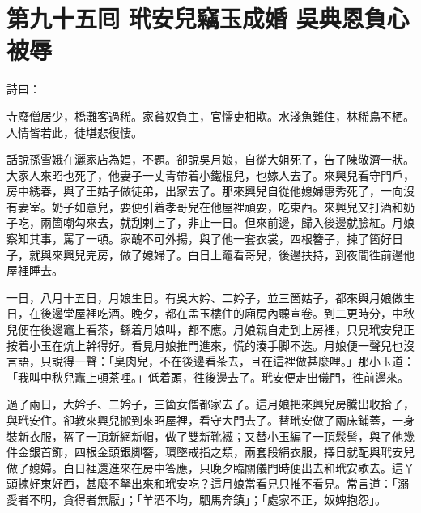 
\chapter*{第九十五囘 玳安兒竊玉成婚 吳典恩負心被辱}


詩曰：

寺廢僧居少，橋灘客過稀。家貧奴負主，官懦吏相欺。水淺魚難住，林稀鳥不栖。人情皆若此，徒堪悲復悽。

話說孫雪娥在灑家店為娼，不題。卻說吳月娘，自從大姐死了，告了陳敬濟一狀。大家人來昭也死了，他妻子一丈青帶着小鐵棍兒，也嫁人去了。來興兒看守門戶，房中綉春，與了王姑子做徒弟，出家去了。{}那來興兒自從他媳婦惠秀死了，一向沒有妻室。奶子如意兒，要便引着孝哥兒在他屋裡頑耍，吃東西。來興兒又打酒和奶子吃，兩箇嘲勾來去，就刮剌上了，非止一日。但來前邊，歸入後邊就臉紅。月娘察知其事，罵了一頓。家醜不可外揚，與了他一套衣裳，四根簪子，揀了箇好日子，就與來興兒完房，做了媳婦了。白日上竈看哥兒，後邊扶持，到夜間徃前邊他屋裡睡去。

一日，八月十五日，月娘生日。有吳大妗、二妗子，並三箇姑子，都來與月娘做生日，在後邊堂屋裡吃酒。晚夕，都在孟玉樓住的廂房內聽宣卷。到二更時分，中秋兒便在後邊竈上看茶，繇着月娘叫，都不應。月娘親自走到上房裡，只見玳安兒正按着小玉在炕上幹得好。看見月娘推門進來，慌的湊手脚不迭。月娘便一聲兒也沒言語，{}只說得一聲：「臭肉兒，不在後邊看茶去，且在這裡做甚麼哩。」那小玉道：「我叫中秋兒竈上頓茶哩。」低着頭，徃後邊去了。玳安便走出儀門，徃前邊來。

過了兩日，大妗子、二妗子，三箇女僧都家去了。這月娘把來興兒房騰出收拾了，與玳安住。卻教來興兒搬到來昭屋裡，看守大門去了。替玳安做了兩床鋪蓋，一身裝新衣服，盔了一頂新網新帽，做了雙新靴襪；又替小玉編了一頂鬏髻，與了他幾件金銀首飾，四根金頭銀脚簪，環墜戒指之類，兩套段絹衣服，擇日就配與玳安兒做了媳婦。{}白日裡還進來在房中答應，只晚夕臨關儀門時便出去和玳安歇去。這丫頭揀好東好西，甚麼不拏出來和玳安吃？這月娘當看見只推不看見。常言道：「溺愛者不明，貪得者無厭」；「羊酒不均，駟馬奔鎮」；「處家不正，奴婢抱怨」。

